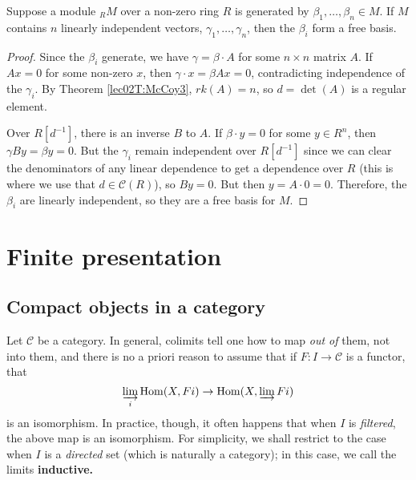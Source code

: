  \begin{corollary}
   Suppose a module ${}_RM$ over a non-zero ring $R$ is generated by $\beta_1,\dots,
   \beta_n\in M$. If $M$ contains $n$ linearly independent vectors, $\gamma_1,\dots,
   \gamma_n$, then the $\beta_i$ form a free basis.
 \end{corollary}
 \begin{proof}
   Since the $\beta_i$ generate, we have $\gamma = \beta\cdot A$ for some $n\times n$
   matrix $A$. If $Ax=0$ for some non-zero $x$, then $\gamma \cdot x = \beta Ax = 0$,
   contradicting independence of the $\gamma_i$. By Theorem \ref{lec02T:McCoy3},
   $rk(A)=n$, so $d=\det(A)$ is a regular element.

   Over $R[d^{-1}]$, there is an inverse $B$ to $A$. If $\beta\cdot
   y=0$ for some $y\in R^n$, then $\gamma By = \beta y=0$. But the $\gamma_i$ remain
   independent over $R[d^{-1}]$ since we can clear the denominators of any linear
   dependence to get a dependence over $R$ (this is where we use that $d\in \mathcal{C}(R)$), so
   $By=0$. But then $y=A\cdot 0 = 0$. Therefore, the $\beta_i$ are linearly independent,
   so they are a free basis for $M$.
\end{proof}

\section{Finite presentation}

\label{noetheriandescent}
\subsection{Compact objects in a category}

Let $\mathcal{C}$ be a category.
In general, colimits tell one how to map \emph{out of} them, not into them,
and there is no a priori reason to assume that if $F: I \to \mathcal{C}$ is a
functor, that
\begin{equation} \label{filtcolimhom} \varinjlim_i \hom(X, Fi) \to \hom(X,
\varinjlim Fi)  \end{equation}
is an isomorphism.
In practice, though, it often happens that when $I$ is 
\emph{filtered}, the above map is an isomorphism. For simplicity, we shall
restrict to the case when $I$ is a \emph{directed }set
(which is naturally a category); in this case, we call the limits
\textbf{inductive.}


